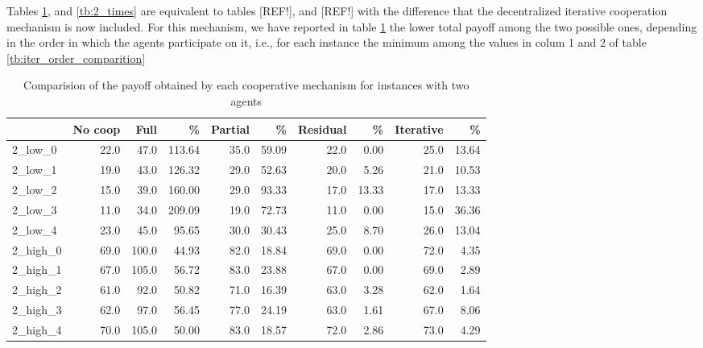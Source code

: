 \documentclass[review]{elsarticle}
\begin{document}
Tables \ref{tb:2_payoffs}, and \ref{tb:2_times} are equivalent to tables [REF!], and [REF!] with the difference that the decentralized iterative cooperation mechanism is now included. For this mechanism, we have reported in table \ref{tb:2_payoffs} the lower total payoff among the two possible ones, depending in the order in which the agents participate on it, i.e., for each instance the minimum among the values in colum 1 and 2 of table \ref{tb:iter_order_comparition}

\begin{table}[h!]
\centering
\caption{Comparision of the payoff obtained by each cooperative mechanism for instances with two agents \label{tb:2_payoffs}}
\begin{adjustbox}{max width=\textwidth}
\begin{tabular}{lrrrrrrrrr}
\toprule
{} &  No coop &   Full &   \% &  Partial &  \% &  Residual &  \% &  Iterative &  \% \\
\midrule
2\_low\_0  &            22.0 &   47.0 &  113.64 &     35.0 &     59.09 &      22.0 &       0.00 &       25.0 &       13.64 \\
2\_low\_1  &            19.0 &   43.0 &  126.32 &     29.0 &     52.63 &      20.0 &       5.26 &       21.0 &       10.53 \\
2\_low\_2  &            15.0 &   39.0 &  160.00 &     29.0 &     93.33 &      17.0 &      13.33 &       17.0 &       13.33 \\
2\_low\_3  &            11.0 &   34.0 &  209.09 &     19.0 &     72.73 &      11.0 &       0.00 &       15.0 &       36.36 \\
2\_low\_4  &            23.0 &   45.0 &   95.65 &     30.0 &     30.43 &      25.0 &       8.70 &       26.0 &       13.04 \\
2\_high\_0 &            69.0 &  100.0 &   44.93 &     82.0 &     18.84 &      69.0 &       0.00 &       72.0 &        4.35 \\
2\_high\_1 &            67.0 &  105.0 &   56.72 &     83.0 &     23.88 &      67.0 &       0.00 &       69.0 &        2.89 \\
2\_high\_2 &            61.0 &   92.0 &   50.82 &     71.0 &     16.39 &      63.0 &       3.28 &       62.0 &        1.64 \\
2\_high\_3 &            62.0 &   97.0 &   56.45 &     77.0 &     24.19 &      63.0 &       1.61 &       67.0 &        8.06 \\
2\_high\_4 &            70.0 &  105.0 &   50.00 &     83.0 &     18.57 &      72.0 &       2.86 &       73.0 &        4.29 \\
\bottomrule
\end{tabular}
\end{adjustbox}
\end{table}
\end{document}
